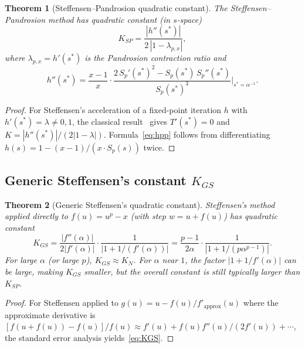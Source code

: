 \documentclass[10pt,a4paper,oneside]{book}
\newtheorem{theorem}{Theorem}[chapter]
\theoremstyle{definition}
\theoremstyle{remark}
\begin{document}
\begin{theorem}[Steffensen--Pandrosion quadratic constant]
\label{thm:KSP}
The Steffensen--Pandrosion method has quadratic constant (in $s$-space)
\begin{equation}
  \label{eq:KSP}
  K_{SP} = \frac{|h''(s^*)|}{2\,|1 - \lambda_{p,x}|},
\end{equation}
where $\lambda_{p,x} = h'(s^*)$ is the Pandrosion contraction ratio and
\begin{equation}
  \label{eq:hpp}
  h''(s^*) = \frac{x-1}{x} \cdot \frac{2\,S_p'(s^*)^2 - S_p(s^*)\,S_p''(s^*)}{S_p(s^*)^3}\bigg|_{s^* = \alpha^{-1}}.
\end{equation}
\end{theorem}

\begin{proof}
For Steffensen's acceleration of a fixed-point iteration $h$ with $h'(s^*) = \lambda \neq 0,1$, the classical result~\cite{stoer} gives $T'(s^*) = 0$ and $K = |h''(s^*)|/(2|1-\lambda|)$.  Formula~\eqref{eq:hpp} follows from differentiating $h(s) = 1 - (x-1)/(x \cdot S_p(s))$ twice.
\end{proof}

\subsection{Generic Steffensen's constant \texorpdfstring{$K_{GS}$}{K\_GS}}

\begin{theorem}[Generic Steffensen's quadratic constant]
\label{thm:KGS}
Steffensen's method applied directly to $f(u) = u^p - x$ (with step $w = u + f(u)$) has quadratic constant
\begin{equation}
  \label{eq:KGS}
  K_{GS} = \frac{|f''(\alpha)|}{2|f'(\alpha)|} \cdot \frac{1}{|1 + 1/(f'(\alpha))|}
  = \frac{p-1}{2\alpha} \cdot \frac{1}{|1 + 1/(p\alpha^{p-1})|}.
\end{equation}
For large $\alpha$ (or large $p$), $K_{GS} \approx K_N$.  For $\alpha$ near $1$, the factor $|1 + 1/f'(\alpha)|$ can be large, making $K_{GS}$ smaller, but the overall constant is still typically larger than $K_{SP}$.
\end{theorem}

\begin{proof}
For Steffensen applied to $g(u) = u - f(u)/f'_{\text{approx}}(u)$ where the approximate derivative is $[f(u+f(u)) - f(u)]/f(u) \approx f'(u) + f(u)f''(u)/(2f'(u)) + \cdots$, the standard error analysis yields~\eqref{eq:KGS}.
\end{proof}
\end{document}
